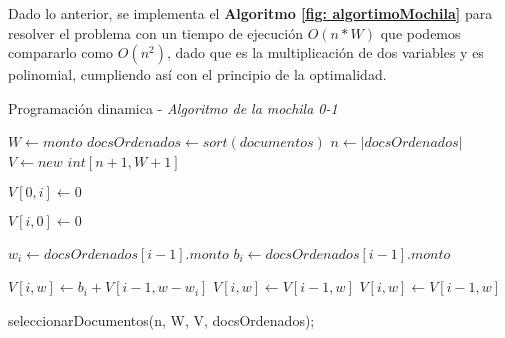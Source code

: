 Dado lo anterior, se implementa el \textbf{Algoritmo \ref{fig: algortimoMochila}} para resolver el problema con un tiempo de ejecución $O(n*W)$ que podemos compararlo como $O(n^2)$, dado que es la multiplicación de dos variables y es polinomial, cumpliendo así con el principio de la optimalidad.


\renewcommand{\algorithmicrequire}{\textbf{Entrada:}}
\renewcommand{\algorithmicensure}{\textbf{Salida:}}


\begin{algorithm}
    \caption{\label{fig: algortimoMochila}Programación dinamica - \textit{Algoritmo de la mochila 0-1}}
    \begin{algorithmic}[1]


    \vspace{3mm}
    \State $W \gets monto$
    \State $docsOrdenados\gets sort(documentos)$
    \State $n \gets |docsOrdenados|$
    \State $V \gets new$ $int[n + 1, W + 1]$

    \vspace{3mm}
        \State $V[0,i] \gets 0$
    \EndFor

    \vspace{3mm}
        \State $V[i,0] \gets 0$
    \EndFor

    \vspace{3mm}
            \State $w_{i} \gets docsOrdenados[i-1].monto$
            \State $b_{i} \gets docsOrdenados[i-1].monto$

                    \State $V[i,w] \gets b_{i} + V[i-1, w-w_{i}]$
                \Else
                    \State $V[i,w] \gets V[i-1,w]$
                \EndIf
            \Else
                \State $V[i,w] \gets V[i-1,w]$
            \EndIf
        \EndFor
    \EndFor

    \vspace{3mm}
    \State seleccionarDocumentos(n, W, V, docsOrdenados);
  \end{algorithmic}
\end{algorithm}


